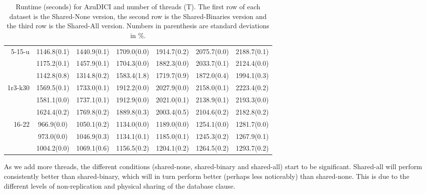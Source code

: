 \begin{table}[h]
\begin{tabular}[h]{rcccccc}
      \multirow{3}{*}{5-15-u}    &    1146.8(0.1)  & 1440.9(0.1)  & 1709.0(0.0)  & 1914.7(0.2)  & 2075.7(0.0)  & 2188.7(0.1) \\
     &    1175.2(0.1) &  1457.9(0.1) &  1704.3(0.0)   &  1882.3(0.0)   &  2033.7(0.1)    & 2124.4(0.0)   \\
   & 1142.8(0.8)  &  1314.8(0.2)   &   1583.4(1.8)   &    1719.7(0.9)  &  1872.0(0.4)  & 1994.1(0.3)  \\ \hline
      \multirow{3}{*}{1r3-k30}   &    1569.5(0.1)  & 1733.0(0.1)  & 1912.2(0.0) &  2027.9(0.0)  & 2158.0(0.1)  & 2223.4(0.2) \\
    &     1581.1(0.0)  & 1737.1(0.1)  & 1912.9(0.0)  &   2021.0(0.1)  &   2138.9(0.1)   &  2193.3(0.0)   \\
   & 1624.4(0.2)   & 1769.8(0.2)   &   1889.8(0.3)   &    2003.4(0.5)   & 2104.6(0.2) &  2182.8(0.2)  \\ \hline
      \multirow{3}{*}{16-22}   &    966.9(0.0)  &  1050.1(0.2)  & 1134.0(0.0)  & 1189.0(0.0) &  1254.1(0.0) &  1281.7(0.0) \\
    &     973.0(0.0)   & 1046.9(0.3)  & 1134.1(0.1)  &   1185.0(0.1)   &  1245.3(0.2)   &  1267.9(0.1)   \\
   & 1004.2(0.0)  &  1069.1(0.6)   &   1156.5(0.2)    &   1204.1(0.2) &   1264.5(0.2)  & 1293.7(0.2)  \\ \hline
    \end{tabular}
    \normalsize
    \caption{Runtime (seconds) for AzuDICI and number of threads (T). 
      The first row of each dataset is the Shared-None version, the second row is the Shared-Binaries version and the third row is the Shared-All version. Numbers in parenthesis are standard deviations in \%.}
    \label{tab:sstime}
  \end{table}
  
  As we add more threads, the different conditions (shared-none,
  shared-binary and shared-all) start to be significant. Shared-all
  will perform consistently better than shared-binary, which will in
  turn perform better (perhaps less noticeably) than shared-none. This
  is due to the different levels of non-replication and physical
  sharing of the database clause.

